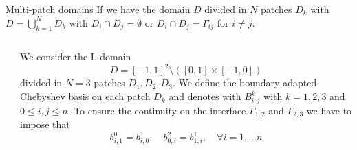 \documentclass{beamer}
\begin{document}
\begin{frame}{Multi-patch domains}
	If we have the domain $D$ divided in $N$ patches $D_k$ with $D = \bigcup_{k=1}^{N} D_k$ with $D_i \cap D_j = \emptyset$ or $D_i \cap D_j = \Gamma_{ij}$ for $i \neq j$.
	\begin{columns}
		\begin{column}{0.3\textwidth}
			\begin{center}
			\end{center}
		\end{column}%
		\begin{column}{0.7\textwidth}
			We consider the L-domain 
			\[ D = [-1, 1]^2\setminus ([0,1]\times [-1,0]) \] 
			divided in $N=3$ patches $ D_1, D_2, D_3 $.
			We define the boundary adapted Chebyshev basis on each patch $D_k$ and denotes with $B_{i,j}^{k}$ with $k=1,2,3$ and $0 \le i,j \le n$. To ensure the continuity on the interface $\Gamma_{1,2}$ and $\Gamma_{2,3}$ we have to impose that
			\[ b^{0}_{i, 1} = b^{1}_{i,0}, \quad b^{2}_{0,i} = b^{1}_{1, i}, \quad \forall i = 1, \dots n\]
		\end{column}
	\end{columns}
\end{frame}

\end{document}
